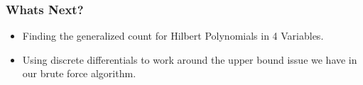 \documentclass{beamer}
\begin{document}

\begin{frame}
	\frametitle{Whats Next?}
	\begin{itemize}
	\item Finding the generalized count for Hilbert Polynomials in 4 Variables.
	\item Using discrete differentials to work around the upper bound issue we have in our brute force algorithm. 
	\end{itemize}
\end{frame}
\end{document}
